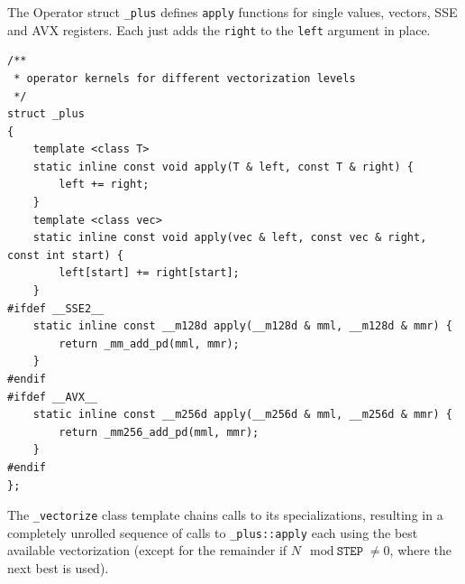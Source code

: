 \documentclass[a4paper]{scrartcl}
\begin{document}
The Operator struct \texttt{\_plus} defines \texttt{apply} functions for single values, vectors, SSE and AVX registers.
Each just adds the \texttt{right} to the \texttt{left} argument in place.

\begin{lstlisting}
/**
 * operator kernels for different vectorization levels
 */
struct _plus
{
    template <class T>
    static inline const void apply(T & left, const T & right) {
        left += right;
    }
    template <class vec>
    static inline const void apply(vec & left, const vec & right, const int start) {
        left[start] += right[start];
    }
#ifdef __SSE2__
    static inline const __m128d apply(__m128d & mml, __m128d & mmr) {
        return _mm_add_pd(mml, mmr);
    }
#endif
#ifdef __AVX__
    static inline const __m256d apply(__m256d & mml, __m256d & mmr) {
        return _mm256_add_pd(mml, mmr);
    }
#endif
};
\end{lstlisting}

The \texttt{\_vectorize} class template chains calls to its specializations, resulting in a completely unrolled sequence of 
calls to \texttt{\_plus::apply} each using the best available vectorization (except for the remainder if $N \mod \texttt{STEP} \neq 0$, where the next best is used).
\end{document}
